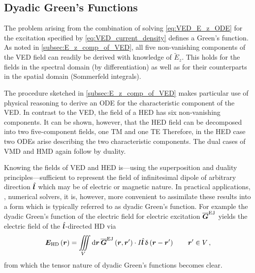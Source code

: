 \subsection{Dyadic Green's Functions}
\label{subsec:dyadic_greens_functions}

The problem arising from the combination of solving \eqref{eq:VED_E_z_ODE}
for the excitation specified by \eqref{eq:VED_current_density} defines a Green's
function.
As noted in \cref{subsec:E_z_comp_of_VED}, all five non-vanishing components of
the \ac{VED} field can readily be derived with knowledge of
$\tilde{E}_z$.
This holds for the fields in the spectral domain (by differentiation) as well as
for their counterparts in the spatial domain (Sommerfeld integrals).

The procedure sketched in \cref{subsec:E_z_comp_of_VED} makes particular use of
physical reasoning to derive an \ac{ODE} for the characteristic component of 
the \ac{VED}. 
In contrast to the \ac{VED}, the field of a \ac{HED} has six non-vanishing
components.
It can be shown, however, that the \ac{HED} field can be decomposed into two
five-component fields, one \ac{TM} and one \ac{TE}
\cite{Sommerfeld1926,Sommerfeld1964,Chew1999}
Therefore, in the \ac{HED} case two \acp{ODE} arise describing the two
characteristic components.
The dual cases of \ac{VMD} and \ac{HMD} again follow by duality.

Knowing the fields of \ac{VED} and \ac{HED} is---using the superposition
and duality principles---sufficient to represent the field of infinitesimal
dipole of arbitrary direction $\uv{l}$ which may be of electric or magnetic
nature.
In practical applications, \eg, numerical solvers, it is, however, more
convenient to assimilate these results into a form which is typically referred
to as dyadic Green's function.
For example the dyadic Green's function of the electric field for electric
excitation $\dyadicGF{EJ}$ yields the electric field of the $\uv{l}$-directed
\ac{HD} via
\begin{equation}
	\pvec{E}_\mathrm{HD} \left(\robs\right) = 
	\iiint\limits_{V} \dd \robs \, 
	\dyadicGF{EJ} \left(\robs, \rsrc\right)
	\cdot
	I \uv{l} \diracDelta \left(\rdiff\right)
	\qquad \rsrc \in V
	\, ,
\end{equation}
from which the tensor nature of dyadic Green's functions becomes clear.

